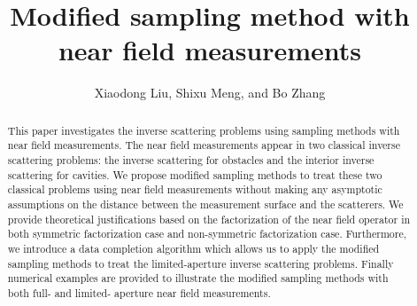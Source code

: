 \documentclass[final]{siamltex}
\begin{document}

\title{Modified sampling method with near field measurements}
\author{Xiaodong Liu\footnotemark[1], Shixu Meng\footnotemark[2], and Bo Zhang\footnotemark[3]}
\renewcommand{\thefootnote}{\fnsymbol{footnote}}
\maketitle

\begin{abstract}
This paper investigates the inverse scattering problems using sampling methods with near field measurements. The near field measurements appear in two classical inverse scattering problems: the inverse scattering for obstacles and the interior inverse scattering for cavities. We propose modified sampling methods to treat these two classical problems using near field measurements without making any asymptotic assumptions on the distance between the measurement surface and the scatterers. We provide theoretical justifications based on the factorization of the near field operator in both symmetric factorization case and non-symmetric factorization case. Furthermore, we introduce a data completion algorithm  which allows us to apply the modified  sampling methods to treat the limited-aperture inverse scattering problems. Finally numerical examples are provided to illustrate the modified  sampling methods with both full- and limited- aperture near field measurements.
\end{abstract}
\end{document}
